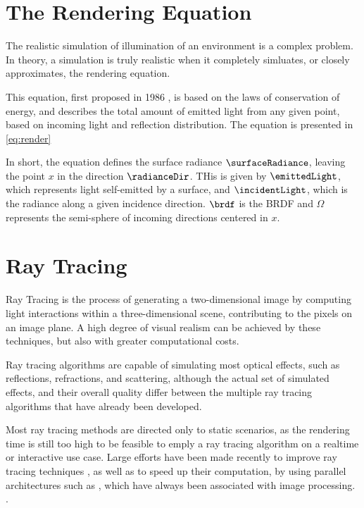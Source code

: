 \documentclass[main.tex]{subfiles}
\begin{document}
\section{The Rendering Equation}

The realistic simulation of illumination of an environment is a complex problem. In theory, a simulation is truly realistic when it completely simluates, or closely approximates, the rendering equation.

This equation, first proposed in 1986 \cite{kajiya1986rendering}, is based on the laws of conservation of energy, and describes the total amount of emitted light from any given point, based on incoming light and reflection distribution. The equation is presented in \cref{eq:render}


In short, the equation defines the surface radiance $\surfaceRadiance$, leaving the point $x$ in the direction $\radianceDir$. THis is given by $\emittedLight$, which represents light self-emitted by a surface, and $\incidentLight$, which is the radiance along a given incidence direction. $\brdf$ is the \acf{BRDF} and $\Omega$ represents the semi-sphere of incoming directions centered in $x$.


\section{Ray Tracing} \label{section:ray_tracing}

Ray Tracing is the process of generating a two-dimensional image by computing light interactions within a three-dimensional scene, contributing to the pixels on an image plane. A high degree of visual realism can be achieved by these techniques, but also with greater computational costs.

Ray tracing algorithms are capable of simulating most optical effects, such as reflections, refractions, and scattering, although the actual set of simulated effects, and their overall quality differ between the multiple ray tracing algorithms that have already been developed.

Most ray tracing methods are directed only to static scenarios, as the rendering time is still too high to be feasible to emply a ray tracing algorithm on a realtime or interactive use case.
Large efforts have been made recently to improve ray tracing techniques , as well as to speed up their computation, by using parallel architectures such as \gpus, which have always been associated with image processing. .
\end{document}
